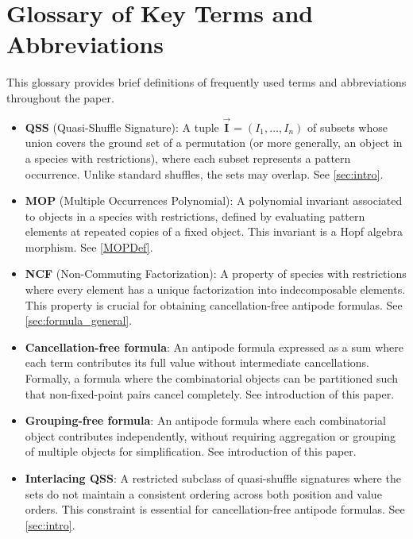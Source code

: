 \documentclass[12pt, reqno]{amsart}
\theoremstyle{definition}
\newcommand{\III}{\vec{\mathbf{I}}}
\begin{document}
\section*{Glossary of Key Terms and Abbreviations}

This glossary provides brief definitions of frequently used terms and abbreviations throughout the paper.

\begin{itemize}

\item \textbf{QSS} (Quasi-Shuffle Signature): A tuple $\III = (I_1, \dots, I_n)$ of subsets whose union covers the ground set of a permutation (or more generally, an object in a species with restrictions), where each subset represents a pattern occurrence. Unlike standard shuffles, the sets may overlap. See \cref{sec:intro}.

\item \textbf{MOP} (Multiple Occurrences Polynomial): A polynomial invariant associated to objects in a species with restrictions, defined by evaluating pattern elements at repeated copies of a fixed object. This invariant is a Hopf algebra morphism. See \cref{MOPDef}.

\item \textbf{NCF} (Non-Commuting Factorization): A property of species with restrictions where every element has a unique factorization into indecomposable elements. This property is crucial for obtaining cancellation-free antipode formulas. See \cref{sec:formula_general}.

\item \textbf{Cancellation-free formula}: An antipode formula expressed as a sum where each term contributes its full value without intermediate cancellations. Formally, a formula where the combinatorial objects can be partitioned such that non-fixed-point pairs cancel completely. See introduction of this paper.

\item \textbf{Grouping-free formula}: An antipode formula where each combinatorial object contributes independently, without requiring aggregation or grouping of multiple objects for simplification. See introduction of this paper.

\item \textbf{Interlacing QSS}: A restricted subclass of quasi-shuffle signatures where the sets do not maintain a consistent ordering across both position and value orders. This constraint is essential for cancellation-free antipode formulas. See \cref{sec:intro}.


\end{itemize}
\end{document}
